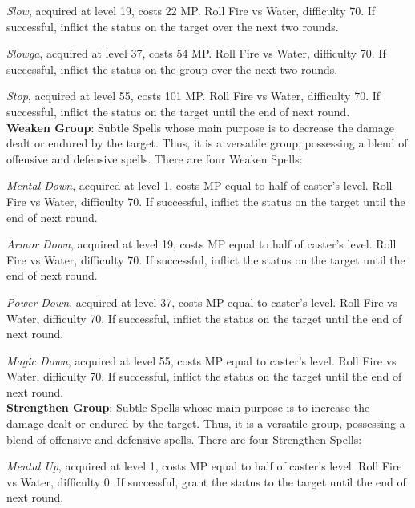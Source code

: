 \begin{multicols}{2}
    \textit{Slow}, acquired at level 19, costs 22 MP\@. Roll Fire vs Water, difficulty 70. If successful, inflict the  status on the target over the next two rounds.
    
    \textit{Slowga}, acquired at level 37, costs 54 MP\@. Roll Fire vs Water, difficulty 70. If successful, inflict the  status on the group over the next two rounds.
    
    \textit{Stop}, acquired at level 55, costs 101 MP\@. Roll Fire vs Water, difficulty 70. If successful, inflict the  status on the target until the end of next round.\\%
    
    \textbf{Weaken Group}: Subtle Spells whose main purpose is to decrease the damage dealt or endured by the target. Thus, it is a versatile group, possessing a blend of offensive and defensive spells. There are four Weaken Spells:
    
    \textit{Mental Down}, acquired at level 1, costs MP equal to half of caster's level. Roll Fire vs Water, difficulty 70. If successful, inflict the  status on the target until the end of next round.
    
    \textit{Armor Down}, acquired at level 19, costs MP equal to half of caster's level. Roll Fire vs Water, difficulty 70. If successful, inflict the  status on the target until the end of next round.
    
    \textit{Power Down}, acquired at level 37, costs MP equal to caster's level. Roll Fire vs Water, difficulty 70. If successful, inflict the  status on the target until the end of next round.
    
    \textit{Magic Down}, acquired at level 55, costs MP equal to caster's level. Roll Fire vs Water, difficulty 70. If successful, inflict the  status on the target until the end of next round.\\%
    
    \textbf{Strengthen Group}: Subtle Spells whose main purpose is to increase the damage dealt or endured by the target. Thus, it is a versatile group, possessing a blend of offensive and defensive spells. There are four Strengthen Spells:
    
    \textit{Mental Up}, acquired at level 1, costs MP equal to half of caster's level. Roll Fire vs Water, difficulty 0. If successful, grant the  status to the target until the end of next round.


\end{multicols}
